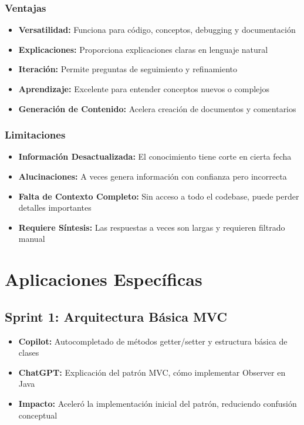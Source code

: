 \documentclass[12pt, a4paper]{article}
\begin{document}
\subsubsection{Ventajas}

\begin{itemize}[leftmargin=2em]
    \item \textbf{Versatilidad:} Funciona para código, conceptos, debugging y documentación
    \item \textbf{Explicaciones:} Proporciona explicaciones claras en lenguaje natural
    \item \textbf{Iteración:} Permite preguntas de seguimiento y refinamiento
    \item \textbf{Aprendizaje:} Excelente para entender conceptos nuevos o complejos
    \item \textbf{Generación de Contenido:} Acelera creación de documentos y comentarios
\end{itemize}

\subsubsection{Limitaciones}

\begin{itemize}[leftmargin=2em]
    \item \textbf{Información Desactualizada:} El conocimiento tiene corte en cierta fecha
    \item \textbf{Alucinaciones:} A veces genera información con confianza pero incorrecta
    \item \textbf{Falta de Contexto Completo:} Sin acceso a todo el codebase, puede perder detalles importantes
    \item \textbf{Requiere Síntesis:} Las respuestas a veces son largas y requieren filtrado manual
\end{itemize}

\section{Aplicaciones Específicas}

\subsection{Sprint 1: Arquitectura Básica MVC}

\begin{itemize}[leftmargin=2em]
    \item \textbf{Copilot:} Autocompletado de métodos getter/setter y estructura básica de clases
    \item \textbf{ChatGPT:} Explicación del patrón MVC, cómo implementar Observer en Java
    \item \textbf{Impacto:} Aceleró la implementación inicial del patrón, reduciendo confusión conceptual
\end{itemize}
\end{document}
